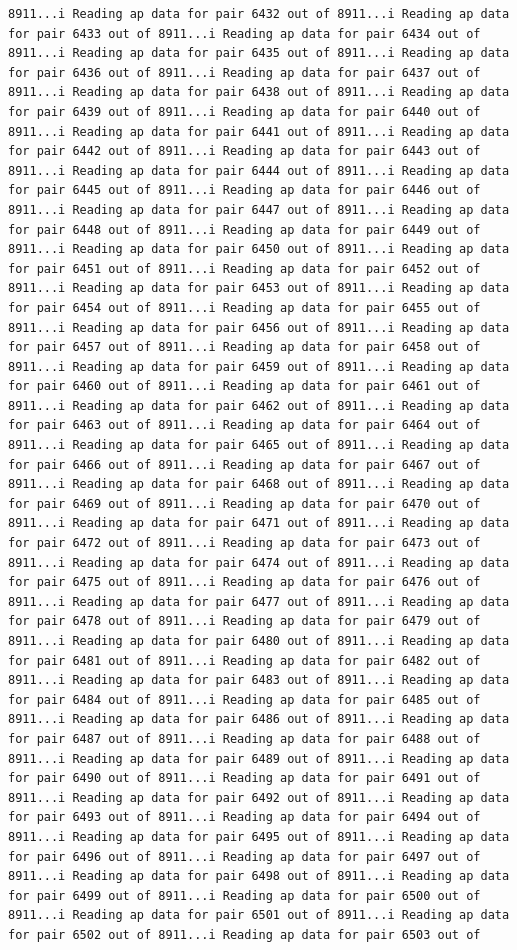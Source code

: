 \documentclass[
]{article}
\begin{document}
\begin{verbatim}
8911...i Reading ap data for pair 6432 out of 8911...i Reading ap data for pair 6433 out of 8911...i Reading ap data for pair 6434 out of 8911...i Reading ap data for pair 6435 out of 8911...i Reading ap data for pair 6436 out of 8911...i Reading ap data for pair 6437 out of 8911...i Reading ap data for pair 6438 out of 8911...i Reading ap data for pair 6439 out of 8911...i Reading ap data for pair 6440 out of 8911...i Reading ap data for pair 6441 out of 8911...i Reading ap data for pair 6442 out of 8911...i Reading ap data for pair 6443 out of 8911...i Reading ap data for pair 6444 out of 8911...i Reading ap data for pair 6445 out of 8911...i Reading ap data for pair 6446 out of 8911...i Reading ap data for pair 6447 out of 8911...i Reading ap data for pair 6448 out of 8911...i Reading ap data for pair 6449 out of 8911...i Reading ap data for pair 6450 out of 8911...i Reading ap data for pair 6451 out of 8911...i Reading ap data for pair 6452 out of 8911...i Reading ap data for pair 6453 out of 8911...i Reading ap data for pair 6454 out of 8911...i Reading ap data for pair 6455 out of 8911...i Reading ap data for pair 6456 out of 8911...i Reading ap data for pair 6457 out of 8911...i Reading ap data for pair 6458 out of 8911...i Reading ap data for pair 6459 out of 8911...i Reading ap data for pair 6460 out of 8911...i Reading ap data for pair 6461 out of 8911...i Reading ap data for pair 6462 out of 8911...i Reading ap data for pair 6463 out of 8911...i Reading ap data for pair 6464 out of 8911...i Reading ap data for pair 6465 out of 8911...i Reading ap data for pair 6466 out of 8911...i Reading ap data for pair 6467 out of 8911...i Reading ap data for pair 6468 out of 8911...i Reading ap data for pair 6469 out of 8911...i Reading ap data for pair 6470 out of 8911...i Reading ap data for pair 6471 out of 8911...i Reading ap data for pair 6472 out of 8911...i Reading ap data for pair 6473 out of 8911...i Reading ap data for pair 6474 out of 8911...i Reading ap data for pair 6475 out of 8911...i Reading ap data for pair 6476 out of 8911...i Reading ap data for pair 6477 out of 8911...i Reading ap data for pair 6478 out of 8911...i Reading ap data for pair 6479 out of 8911...i Reading ap data for pair 6480 out of 8911...i Reading ap data for pair 6481 out of 8911...i Reading ap data for pair 6482 out of 8911...i Reading ap data for pair 6483 out of 8911...i Reading ap data for pair 6484 out of 8911...i Reading ap data for pair 6485 out of 8911...i Reading ap data for pair 6486 out of 8911...i Reading ap data for pair 6487 out of 8911...i Reading ap data for pair 6488 out of 8911...i Reading ap data for pair 6489 out of 8911...i Reading ap data for pair 6490 out of 8911...i Reading ap data for pair 6491 out of 8911...i Reading ap data for pair 6492 out of 8911...i Reading ap data for pair 6493 out of 8911...i Reading ap data for pair 6494 out of 8911...i Reading ap data for pair 6495 out of 8911...i Reading ap data for pair 6496 out of 8911...i Reading ap data for pair 6497 out of 8911...i Reading ap data for pair 6498 out of 8911...i Reading ap data for pair 6499 out of 8911...i Reading ap data for pair 6500 out of 8911...i Reading ap data for pair 6501 out of 8911...i Reading ap data for pair 6502 out of 8911...i Reading ap data for pair 6503 out of 
\end{verbatim}
\end{document}
